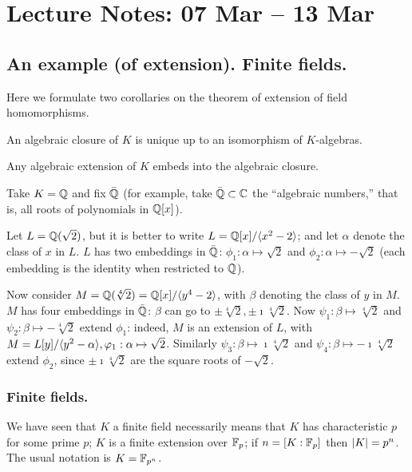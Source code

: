 \section[Finite fields. Separability, perfect fields.]{Lecture Notes: 07 Mar -- 13 Mar}

\subsection{An example (of extension). Finite fields.}
Here we formulate two corollaries on the theorem of extension of field homomorphisms.

\begin{cor}
An algebraic closure of $K$ is unique up to an isomorphism of $K$-algebras.
\end{cor}

\begin{cor}
Any algebraic extension of $K$ embeds into the algebraic closure.
\end{cor}

\begin{ex}
Take $K = \mathbb{Q}$ and fix $\bar{\mathbb{Q}}$ (for example, take $\bar{\mathbb{Q}} \subset \mathbb{C}$ the ``algebraic numbers,'' that is, all roots of polynomials in $\mathbb{Q}[x]$). 

Let $L = \mathbb{Q}(\sqrt{2})$, but it is better to write $L = \mathbb{Q}[x] / \langle x^2 - 2 \rangle$; and let $\alpha$ denote the class of $x$ in $L$. 
$L$ has two embeddings in $\bar{\mathbb{Q}}$: $\phi_1: \alpha \mapsto \sqrt{2}$ and $\phi_2: \alpha \mapsto -\sqrt{2}$ (each embedding is the identity when restricted to $\mathbb{Q}$). 

Now consider $M = \mathbb{Q}(\sqrt[4]{2}) = \mathbb{Q}[x]/\langle y^4 - 2 \rangle$, with $\beta$ denoting the class of $y$ in $M$.
$M$ has four embeddings in $\bar{\mathbb{Q}}$: $\beta$ can go to $\pm\sqrt[4]{2}, \pm\imath\sqrt[4]{2}$. 
Now $\psi_1: \beta \mapsto \sqrt[4]{2}$ and $\psi_2: \beta \mapsto -\sqrt[4]{2}$ extend $\phi_1$: indeed, $M$ is an extension of $L$, with $M = L[y] / \langle y^2 - \alpha \rangle, \varphi_1: \alpha \mapsto \sqrt{2}$. 
Similarly $\psi_3: \beta \mapsto \imath\sqrt[4]{2}$ and $\psi_4: \beta \mapsto -\imath\sqrt[4]{2}$ extend $\phi_2$, since $\pm\imath\sqrt[4]{2}$ are the square roots of $-\sqrt{2}$.
\end{ex}

\subsubsection{Finite fields.}
We have seen that $K$ a finite field necessarily means that $K$ has characteristic $p$ for some prime $p$; $K$ is a finite extension over $\mathbb{F}_p$; if $n = [K:\mathbb{F}_p]$ then $\left|K\right| = p^n$. 
The usual notation is $K = \mathbb{F}_{p^n}$.

